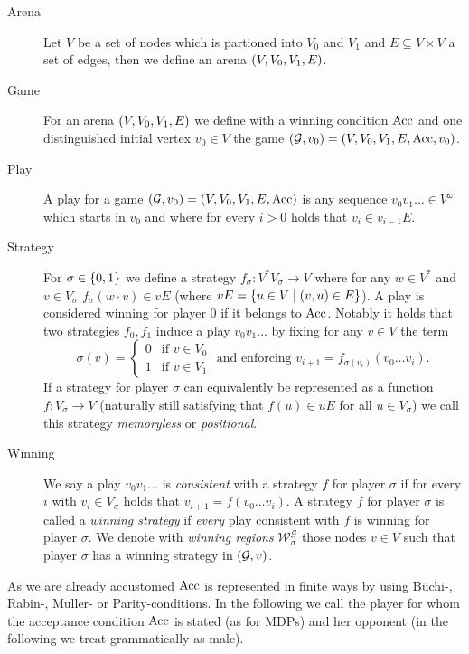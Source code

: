\begin{definition}
  \begin{description}
    \item [Arena] Let $V$ be a set of nodes which is partioned into $V_{0}$ and
      $V_{1}$ and $E\subseteq V\times V$ a set of edges, then we define an
      arena $\left(V, V_{0}, V_{1}, E\right)$.
    \item [Game] For an arena $\left(V, V_{0}, V_{1}, E\right)$ we define with a
      winning condition $\operatorname{Acc}$ and one distinguished initial vertex
      $v_{0}\in V$ the game
      $\left(\mathcal{G}, v_{0}\right) = \left(V, V_{0}, V_{1}, E, \operatorname{Acc}, v_{0}\right)$.
    \item [Play] A play for a game $\left(\mathcal{G}, v_{0}\right) = \left(V,
      V_{0}, V_{1}, E, \operatorname{Acc}\right)$ is any sequence $v_{0}v_{1}\dots\in
      V^{\omega}$ which starts in $v_{0}$ and where for every $i > 0$ holds
      that $v_{i}\in v_{i-1}E$.
    \item [Strategy] For $\sigma\in\left\{0,1\right\}$ we define a strategy
      $f_{\sigma}: V^{*}V_{\sigma}\rightarrow V$ where for any $w\in V^{*}$ and
      $v\in V_{\sigma}$ $f_{\sigma}(w\cdot v)\in vE$ (where $vE =
      \left\{u\in V\mid\left(v,u\right)\in E\right\}$). A play is considered winning for
      player $0$ if it belongs to $\operatorname{Acc}$. Notably it holds that two strategies
      $f_{0}, f_{1}$ induce a play $v_{0}v_{1}\dots$ by fixing for any $v\in V$
      the term
      \begin{equation*}
        \sigma(v) = \begin{cases}
          0&\text{if }v\in V_{0}\\
          1&\text{if }v\in V_{1}
        \end{cases}\text{ and enforcing }
        v_{i+1} = f_{\sigma(v_{i})}(v_{0}\dots v_{i}).
      \end{equation*}
      If a strategy for player $\sigma$ can equivalently be represented as a
      function $f:V_{\sigma}\rightarrow V$ (naturally still satisfying that
      $f(u)\in uE$ for all $u\in V_{\sigma}$) we call this strategy
      \emph{memoryless} or \emph{positional}.
    \item [Winning] We say a play $v_{0}v_{1}\dots$ is \emph{consistent} with a
      strategy $f$ for player $\sigma$ if for every $i$ with
      $v_{i}\in V_{\sigma}$ holds that $v_{i+1} = f(v_{0}\dots v_{i})$. 
      A strategy $f$ for player $\sigma$ is called a \emph{winning strategy} if
      \emph{every} play consistent with $f$ is winning for player $\sigma$.
      We denote with \emph{winning regions}
      $\mathcal{W}^{\mathcal{G}}_{\sigma}$ those nodes $v\in V$ such that
      player $\sigma$ has a winning strategy in $\left(\mathcal{G}, v\right)$.
  \end{description}
  As we are already accustomed $\operatorname{Acc}$ is represented in finite ways by using
  Büchi-, Rabin-, Muller- or Parity-conditions. In the following we call the 
  player for whom the acceptance condition $\operatorname{Acc}$ is stated \eve{} (as for 
  \acp{MDP}) and her opponent \adam{} (in the following we treat \adam{} 
  grammatically as male).
\end{definition}
